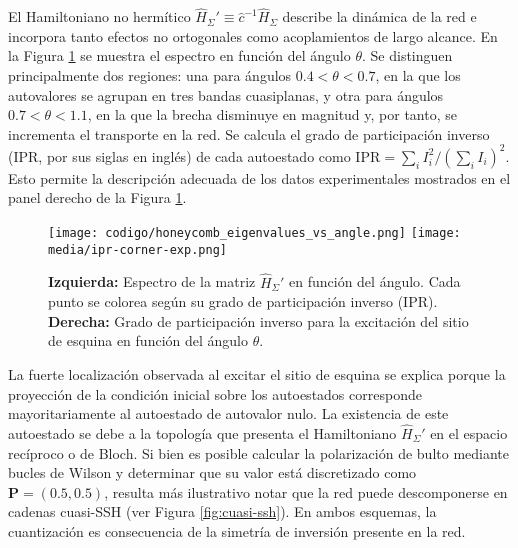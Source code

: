 El Hamiltoniano no hermítico $\hat{H}_\Sigma' \equiv \hat{c}^{-1} \hat{H}_\Sigma$ describe la dinámica de la red e incorpora tanto efectos no ortogonales como acoplamientos de largo alcance. En la Figura \ref{fig:honeycomb-spectra} se muestra el espectro en función del ángulo $\theta$. Se distinguen principalmente dos regiones: una para ángulos $0.4 < \theta < 0.7$, en la que los autovalores se agrupan en tres bandas cuasiplanas, y otra para ángulos $0.7 < \theta < 1.1$, en la que la brecha disminuye en magnitud y, por tanto, se incrementa el transporte en la red. Se calcula el grado de participación inverso (IPR, por sus siglas en inglés) de cada autoestado como $\text{IPR} = \sum_i I_i^2/(\sum_i I_i)^2$. Esto permite la descripción adecuada de los datos experimentales mostrados en el panel derecho de la Figura \ref{fig:honeycomb-spectra}.
\begin{figure}[H]
	\centering
	\texttt{[image: codigo/honeycomb\_eigenvalues\_vs\_angle.png]}
	\texttt{[image: media/ipr-corner-exp.png]}
	\caption[Espectro de la red de panal de abeja de modos $p_y$ en función del ángulo]{\textbf{Izquierda:} Espectro de la matriz $\hat{H}_\Sigma'$ en función del ángulo. Cada punto se colorea según su grado de participación inverso (IPR). \textbf{Derecha:} Grado de participación inverso para la excitación del sitio de esquina en función del ángulo $\theta$.\label{fig:honeycomb-spectra}}
\end{figure} \vspace{-3ex}
La fuerte localización observada al excitar el sitio de esquina se explica porque la proyección de la condición inicial sobre los autoestados corresponde mayoritariamente al autoestado de autovalor nulo. La existencia de este autoestado se debe a la topología que presenta el Hamiltoniano $\hat{H}_\Sigma'$ en el espacio recíproco o de Bloch. Si bien es posible calcular la polarización de bulto mediante bucles de Wilson y determinar que su valor está discretizado como $\mathbf{P} = (0.5, 0.5)$, resulta más ilustrativo notar que la red puede descomponerse en cadenas cuasi-SSH (ver Figura \ref{fig:cuasi-ssh}). En ambos esquemas, la cuantización es consecuencia de la simetría de inversión presente en la red. 

